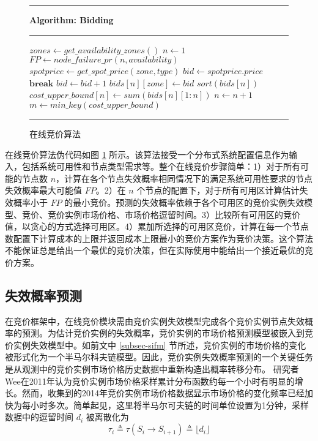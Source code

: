 \begin{figure}
\rule[-.2pt]{\textwidth}{0.9pt}
\textbf{Algorithm: Bidding}

\rule[-.2pt]{\textwidth}{0.5pt}

\begin{algorithmic}[1]

\State $zones\gets get\_availability\_zones()$
\State $n\gets 1$
    \State $FP\gets node\_failure\_pr(n, availability)$
        \State $spotprice\gets get\_spot\_price(zone, type)$
        \State $bid\gets spotprice.price$
                \State $\textbf{break}$
            \Else{}
                \State $bid\gets bid + 1$
            \EndIf
        \EndWhile
        \State $bids[n][zone]\gets bid$
    \EndFor
    \State $sort(bids[n])$
    \State $cost\_upper\_bound[n]\gets sum(bids[n][1:n])$
    \State $n\gets n + 1$
\EndWhile
\State $m\gets min\_key(cost\_upper\_bound)$
\State {}
\end{algorithmic}
\rule[-.2pt]{\textwidth}{0.8pt}
\caption{在线竞价算法}\label{figure:bidding-algo}
\end{figure}

在线竞价算法伪代码如图 \ref{figure:bidding-algo} 所示。该算法接受一个分布式系统配置信息作为输入，包括系统可用性和节点类型需求等。整个在线竞价步骤简单：1）对于所有可能的节点数 $n$，计算在各个节点失效概率相同情况下的满足系统可用性要求的节点失效概率最大可能值 $FP$。2）在 $n$ 个节点的配置下，对于所有可用区计算估计失效概率小于 $FP$ 的最小竞价。预测的失效概率依赖于各个可用区的竞价实例失效模型、竞价、竞价实例市场价格、市场价格逗留时间。3）比较所有可用区的竞价值，以贪心的方式选择可用区。4）累加所选择的可用区竞价，计算在每一个节点数配置下计算成本的上限并返回成本上限最小的竞价方案作为竞价决策。这个算法不能保证总是给出一个最优的竞价决策，但在实际使用中能给出一个接近最优的竞价方案。

\subsection{失效概率预测}
在竞价框架中，在线竞价模块需由竞价实例失效模型完成各个竞价实例节点失效概率的预测。为估计竞价实例的失效概率，竞价实例的市场价格预测模型被嵌入到竞价实例失效模型中。如前文中 \ref{subsec-sifm} 节所述，竞价实例的市场价格的变化被形式化为一个半马尔科夫链模型。因此，竞价实例失效概率预测的一个关键任务是从观测中的竞价实例市场价格历史数据中重新构造出概率转移分布。
研究者Wee\cite{5948651}在2011年认为竞价实例市场价格采样累计分布函数约每一个小时有明显的增长。然而，收集到的2014年竞价实例市场价格数据显示市场价格的变化频率已经加快为每小时多次。简单起见，这里将半马尔可夫链的时间单位设置为1分钟，采样数据中的逗留时间 $d_i$ 被离散化为
\begin{equation}
\tau_i \triangleq \tau(S_i \rightarrow S_{i+1}) \triangleq \lfloor d_i \rfloor
\end{equation}


